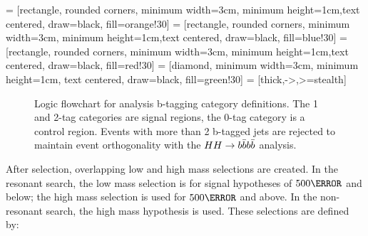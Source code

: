  = [rectangle, rounded corners, minimum width=3cm, minimum height=1cm,text centered, draw=black, fill=orange!30]
 = [rectangle, rounded corners, minimum width=3cm, minimum height=1cm,text centered, draw=black, fill=blue!30]
 = [rectangle, rounded corners, minimum width=3cm, minimum height=1cm,text centered, draw=black, fill=red!30]
 = [diamond, minimum width=3cm, minimum height=1cm, text centered, draw=black, fill=green!30]
 = [thick,->,>=stealth]
\begin{figure}[htbp]
  \centering
  \caption[Logic flowchart for analysis b-tagging category definitions]{Logic flowchart for analysis b-tagging category definitions. The 1 and 2-tag categories are signal regions, the 0-tag category is a control region. Events with more than 2 b-tagged jets are rejected to maintain event orthogonality with the $HH\rightarrow b\bar{b}b\bar{b}$ analysis.}
  \label{fig:btag-logic}
\end{figure}

After selection, overlapping low and high mass selections are created. In the resonant search, the low mass selection is for signal hypotheses of $\unit{500}{\GeV}$ and below; the high mass selection is used for $\unit{500}{\GeV}$ and above. In the non-resonant search, the high mass hypothesis is used. These selections are defined by:

